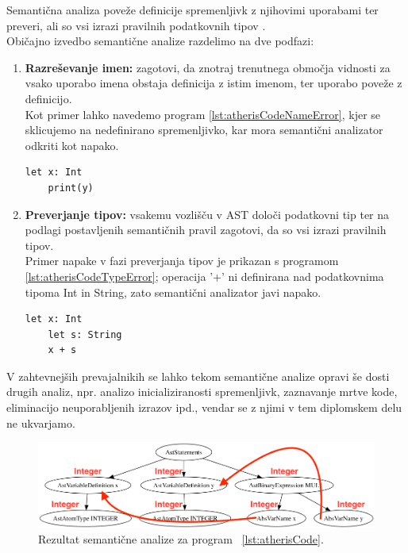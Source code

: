 \documentclass[a4paper, 12p]{book}
\begin{document}
Semantična analiza poveže definicije spremenljivk z njihovimi uporabami ter preveri, ali so vsi izrazi pravilnih podatkovnih tipov \cite{modernCompiler}. \\
\indent Običajno izvedbo semantične analize razdelimo na dve podfazi:
\begin{enumerate}
	\item \textbf{Razreševanje imen:} zagotovi, da znotraj trenutnega območja vidnosti za vsako uporabo imena obstaja definicija z istim imenom, ter uporabo poveže z definicijo. \\
	Kot primer lahko navedemo program \ref{lst:atherisCodeNameError}, kjer se sklicujemo na nedefinirano spremenljivko, kar mora semantični analizator odkriti kot napako.
	\renewcommand{\lstlistingname}{Program}
	\begin{lstlisting}[caption={Primer programa, kjer spremenljivka \textit{y} ni definirana.}, label={lst:atherisCodeNameError},captionpos=b]
	let x: Int
	print(y)
	\end{lstlisting}
	
	\item \textbf{Preverjanje tipov:} vsakemu vozlišču v AST določi podatkovni tip ter na podlagi postavljenih semantičnih pravil zagotovi, da so vsi izrazi pravilnih tipov. \\
	Primer napake v fazi preverjanja tipov je prikazan s programom \ref{lst:atherisCodeTypeError}; operacija '+' ni definirana nad podatkovnima tipoma {\ttfamily Int} in {\ttfamily String}, zato semantični analizator javi napako.
	
	\renewcommand{\lstlistingname}{Program}
	\begin{lstlisting}[caption={Primer programa, kjer je napaka v podatkovnih tipih.},label={lst:atherisCodeTypeError},captionpos=b]
	let x: Int
	let s: String
	x + s
	\end{lstlisting}
	
\end{enumerate}

V zahtevnejših prevajalnikih se lahko tekom semantične analize opravi še dosti drugih analiz, npr. analizo inicializiranosti spremenljivk, zaznavanje mrtve kode, eliminacijo neuporabljenih izrazov ipd., vendar se z njimi v tem diplomskem delu ne ukvarjamo.

\begin{figure}[h]
	\begin{center}
		\includegraphics[width=1\textwidth]{resources/astSeman.png}
	\end{center}
	\caption{Rezultat semantične analize za program ~\ref{lst:atherisCode}.}
	\label{image:astSeman}
\end{figure}
\end{document}
